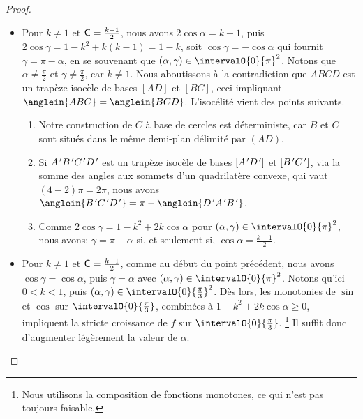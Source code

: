 \begin{proof}
\begin{itemize}
	    \item Pour $k \neq 1$ et $\mathsf{C} = \frac{k - 1}{2}$,
	    nous avons $2\cos \alpha = k - 1$, 
	    puis 
	    $2 \cos \gamma = 1 - k^2 + k(k - 1) = 1 - k$,
	    soit
	    $\cos \gamma = - \cos \alpha$ qui fournit
	    $\gamma = \pi - \alpha$, en se souvenant que $(\alpha , \gamma) \in \intervalO{0}{\pi}^2$.
	    Notons que $\alpha \neq \frac{\pi}{2}$ et $\gamma \neq \frac{\pi}{2}$, car $k \neq 1$. 
	    Nous aboutissons à la contradiction que $ABCD$ est un trapèze isocèle de bases $[AD]$ et $[BC]$, ceci impliquant $\anglein{ABC} = \anglein{BCD}$. 
	    L'isocélité vient des points suivants.
	    \begin{enumerate}
	        \item Notre construction de $C$ à base de cercles est déterministe, car $B$ et $C$ sont situés dans le même demi-plan délimité par $(AD)$.

	        \item Si $A^{\,\prime} B^{\,\prime} C^{\,\prime} D^{\,\prime}$ est un trapèze isocèle de bases $[A^{\,\prime} D^{\,\prime}]$ et $[B^{\,\prime} C^{\,\prime}]$, via la somme des angles aux sommets d'un quadrilatère convexe, qui vaut $(4 - 2) \pi = 2 \pi$, nous avons
	        $\anglein{\primeit{B} \primeit{C} \primeit{D}} = \pi - \anglein{\primeit{D} \primeit{A} \primeit{B}}$.

	        \item Comme $2 \cos \gamma = 1 - k^2 + 2 k \cos \alpha$ pour $(\alpha, \gamma) \in \intervalO{0}{\pi}^2$,
	        nous avons:
	        $\gamma = \pi - \alpha$ si, et seulement si, $\cos \alpha = \frac{k - 1}{2}$.
	    \end{enumerate}


	    \item Pour $k \neq 1$ et $\mathsf{C} = \frac{k + 1}{2}$,
	    comme au début du point précédent,
	    nous avons $\cos \gamma = \cos \alpha$, puis $\gamma = \alpha$ avec $(\alpha , \gamma) \in \intervalO{0}{\pi}^2$.
	    Notons qu'ici $0 < k < 1$, puis $(\alpha , \gamma) \in \intervalO{0}{\frac{\pi}{3}}^2$.
	    Dès lors, les monotonies de $\sin$ et $\cos$ sur $\intervalO{0}{\frac{\pi}{3}}$, combinées à $1 - k^2 + 2 k \cos \alpha \geq 0$, impliquent la stricte croissance de $f$ sur $\intervalO{0}{\frac{\pi}{3}}$.%
	    \footnote{
	    	Nous utilisons la composition de fonctions monotones, ce qui n'est pas toujours faisable.
	    }
	    Il suffit donc d'augmenter légèrement la valeur de  $\alpha$.
	\end{itemize}
	
	\null\vspace{-6ex}
\end{proof}


